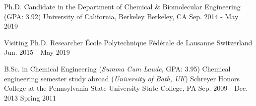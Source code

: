

\begin{cventries}



  \cventrynodescr
    {Ph.D. Candidate in the Department of Chemical \& Biomolecular Engineering (GPA: 3.92)}
    {University of California, Berkeley} %
    {Berkeley, CA} %
    {Sep. 2014 - May 2019} %
    {}

  \cventrynodescr
    {Visiting Ph.D. Researcher} %
    {\'{E}cole Polytechnique F\'{e}d\'{e}rale de Lausanne} %
    {Switzerland} %
    {Jun. 2015 - May 2019} %
    {}

  \twopositioncventry
    {B.Sc. in Chemical Engineering (\textit{Summa Cum Laude}, GPA: 3.95)} %
    {Chemical engineering semester study abroad (\textit{University of Bath, UK})} %
    {Schreyer Honors College at the Pennsylvania State University} %
    {State College, PA} %
    {Sep. 2009 - Dec. 2013} %
    {Spring 2011} %
    


\end{cventries}
